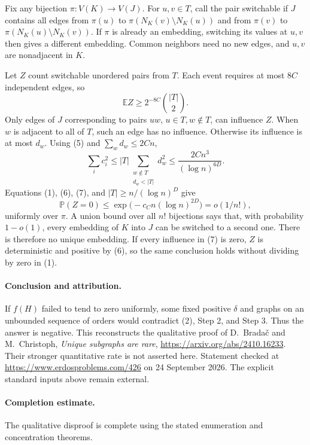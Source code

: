 Fix any bijection \(\pi:V(K)\to V(J)\). For \(u,v\in T\), call the
pair switchable if \(J\) contains all edges from \(\pi(u)\) to
\(\pi(N_K(v)\setminus N_K(u))\) and from \(\pi(v)\) to
\(\pi(N_K(u)\setminus N_K(v))\).
If \(\pi\) is already an embedding, switching its values at \(u,v\)
then gives a different embedding. Common neighbors need no new edges,
and \(u,v\) are nonadjacent in \(K\).

Let \(Z\) count switchable unordered pairs from \(T\).
Each event requires at most \(8C\) independent edges, so
\[
 \mathbb EZ\geq2^{-8C}\binom{|T|}{2}.
 \tag{6}
\]
Only edges of \(J\) corresponding to pairs \(uw\), \(u\in T,w\notin T\),
can influence \(Z\). When \(w\) is adjacent to all of \(T\), such an
edge has no influence. Otherwise its influence is at most \(d_w\).
Using (5) and \(\sum_wd_w\leq2Cn\),
\[
 \sum_i c_i^2
 \leq |T|\sum_{\substack{w\notin T\\d_w<|T|}}d_w^2
 \leq\frac{2Cn^3}{(\log n)^{6D}}.
 \tag{7}
\]
Equations (1), (6), (7), and \(|T|\geq n/(\log n)^D\) give
\[
 \mathbb P(Z=0)
 \leq\exp\bigl(-c_C n(\log n)^{2D}\bigr)
 =o(1/n!),
 \tag{8}
\]
uniformly over \(\pi\). A union bound over all \(n!\) bijections says
that, with probability \(1-o(1)\), every embedding of \(K\) into \(J\)
can be switched to a second one. There is therefore no unique embedding.
If every influence in (7) is zero, \(Z\) is deterministic and positive
by (6), so the same conclusion holds without dividing by zero in (1).

\paragraph{Conclusion and attribution.}
If \(f(H)\) failed to tend to zero uniformly, some fixed positive
\(\delta\) and graphs on an unbounded sequence of orders would
contradict (2), Step 2, and Step 3. Thus the answer is negative.
This reconstructs the qualitative proof of D.~Brada\v{c} and
M.~Christoph, \emph{Unique subgraphs are rare},
\url{https://arxiv.org/abs/2410.16233}.
Their stronger quantitative rate is not asserted here.
Statement checked at \url{https://www.erdosproblems.com/426}
on 24 September 2026. The explicit standard inputs above remain external.

\paragraph{Completion estimate.}
The qualitative disproof is complete using the stated enumeration and concentration theorems.
